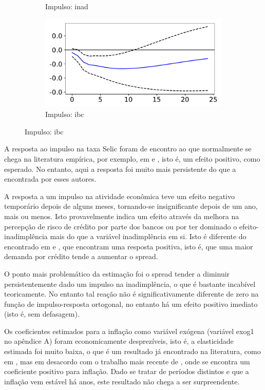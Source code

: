 \documentclass[a4paper,
               article,
               12pt,
               openany,
               oneside,
               english,
               brazil]{abntex2}
\numberwithin{equation}{section}
\begin{document}
\begin{figure}[!hbt]
\begin{subfigure}[t]{.5\linewidth}
            \caption{Impulso: inad}
        \end{subfigure}
        \begin{subfigure}[t]{.5\linewidth}
            \includegraphics[width = \textwidth, scale=1]{irf/orth_spread_ibc.pdf}
            \caption{Impulso: ibc}
        \end{subfigure}
    \end{figure}

    A resposta ao impulso na taxa Selic foram de encontro ao que normalmente se chega na literatura empírica, por exemplo, em \textcite{oreiro} e \textcite{chaim}, isto é, um efeito positivo, como esperado. No entanto, aqui a resposta foi muito mais persistente do que a encontrada por esses autores.

    A resposta a um impulso na atividade econômica teve um efeito negativo temporário depois de alguns meses, tornando-se insignificante depois de um ano, mais ou menos. Isto provavelmente indica um efeito através da melhora na percepção de risco de crédito por parte dos bancos ou por ter dominado o efeito-inadimplência mais do que a variável inadimplência em si. Isto é diferente do encontrado em \textcite{oreiro} e \textcite{chaim}, que encontram uma resposta positiva, isto é, que uma maior demanda por crédito tende a aumentar o spread.

    O ponto mais problemático da estimação foi o spread tender a diminuir persistentemente dado um impulso na inadimplência, o que é bastante incabível teoricamente. No entanto tal reação não é significativamente diferente de zero na função de impulso-resposta ortogonal, no entanto há um efeito positivo imediato (isto é, sem defasagem).

    Os coeficientes estimados para a inflação como variável exógena (variável exog1 no apêndice A) foram economicamente desprezíveis, isto é, a elasticidade estimada foi muito baixa, o que é um resultado já encontrado na literatura, como em \textcite{oreiro}, mas em desacordo com o trabalho mais recente de \textcite{chaim}, onde se encontra um coeficiente positivo para inflação. Dado se tratar de períodos distintos e que a inflação vem estável há anos, este resultado não chega a ser surpreendente.
\end{document}
